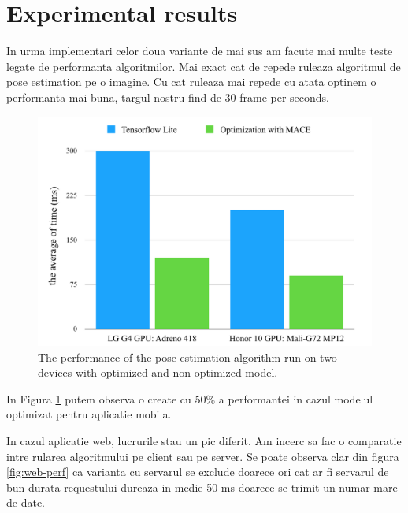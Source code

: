 \section{Experimental results}

In urma implementari celor doua variante de mai sus am facute mai multe teste legate de performanta algoritmilor.
Mai exact cat de repede ruleaza algoritmul de pose estimation pe o imagine. Cu cat ruleaza mai repede cu atata optinem o performanta mai buna, targul nostru find de 30 frame per seconds.


 \begin{figure}[htbp]
	\centerline{\includegraphics[scale=0.7]{fig/mobile-performace.png}}  
	\caption{The performance of the pose estimation algorithm run on two devices with optimized and non-optimized model.}
	\label{fig:mobile-perf}
\end{figure}

In Figura \ref{fig:mobile-perf} putem observa o create cu 50\% a performantei in cazul modelul optimizat pentru aplicatie mobila.

In cazul aplicatie web, lucrurile stau un pic diferit. Am incerc sa fac o comparatie intre rularea algoritmului pe client sau pe server. Se poate observa clar din figura \ref{fig:web-perf} ca varianta cu servarul se exclude doarece ori cat ar fi servarul de bun durata requestului dureaza in medie 50 ms doarece se trimit un numar mare de date.


